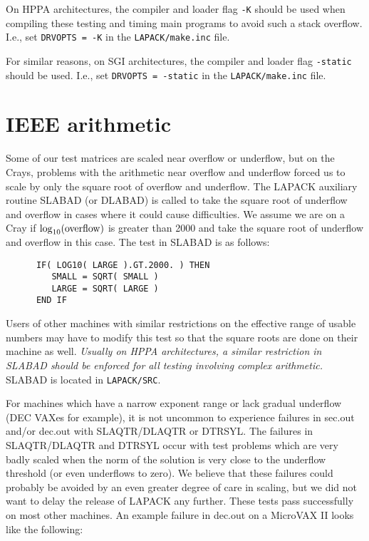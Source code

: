 On HPPA architectures, the 
compiler and loader flag {\tt -K} should be used when compiling these testing
and timing main programs to avoid such a stack overflow.  I.e., set
{\tt DRVOPTS = -K} in the {\tt LAPACK/make.inc} file.

For similar reasons,
on SGI architectures, the compiler and loader flag {\tt -static} should be
used.  I.e., set {\tt DRVOPTS = -static} in the {\tt LAPACK/make.inc} file.

\section{IEEE arithmetic}

Some of our test matrices are scaled near overflow or underflow,
but on the Crays, problems with the arithmetic near overflow and
underflow forced us to scale by only the square root of overflow
and underflow.
The LAPACK auxiliary routine SLABAD (or DLABAD) is called to
take the square root of underflow and overflow in cases where it
could cause difficulties.
We assume we are on a Cray if $ \log_{10} ({\rm overflow})$
is greater than 2000
and take the square root of underflow and overflow in this case.
The test in SLABAD is as follows:
\begin{verbatim}
      IF( LOG10( LARGE ).GT.2000. ) THEN
         SMALL = SQRT( SMALL )
         LARGE = SQRT( LARGE )
      END IF
\end{verbatim}
Users of other machines with similar restrictions on the effective
range of usable numbers may have to modify this test so that the
square roots are done on their machine as well.  {\em Usually on
HPPA architectures, a similar restriction in SLABAD should be enforced
for all testing involving complex arithmetic.}
SLABAD is located in {\tt LAPACK/SRC}.

For machines which have a narrow exponent range or lack gradual
underflow (DEC VAXes for example), it is not uncommon to experience
failures in sec.out and/or dec.out with SLAQTR/DLAQTR or DTRSYL.
The failures in SLAQTR/DLAQTR and DTRSYL
occur with test problems which are very badly scaled when the norm of
the solution is very close to the underflow
threshold (or even underflows to zero).  We believe that these failures
could probably be avoided by an even greater degree of care in scaling,
but we did not want to delay the release of LAPACK any further.  These
tests pass successfully on most other machines.  An example failure in
dec.out on a MicroVAX II looks like the following:


